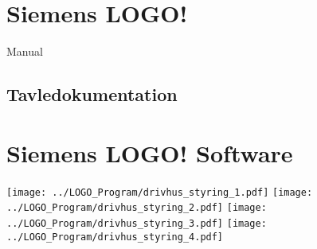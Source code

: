 \section{Siemens LOGO!}

\cite{logo_sm} Manual

\subsection{Tavledokumentation}

\section{Siemens LOGO! Software}
\newpage
    \texttt{[image: ../LOGO\_Program/drivhus\_styring\_1.pdf]}
\newpage
    \texttt{[image: ../LOGO\_Program/drivhus\_styring\_2.pdf]}
\newpage
    \texttt{[image: ../LOGO\_Program/drivhus\_styring\_3.pdf]}
\newpage
    \texttt{[image: ../LOGO\_Program/drivhus\_styring\_4.pdf]}
%
